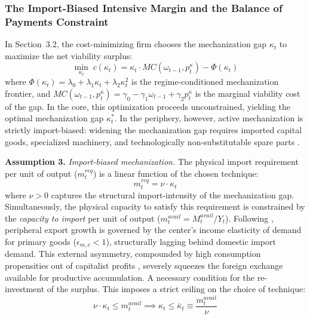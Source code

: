 \subsubsection{The Import-Biased Intensive Margin and the
	Balance of Payments Constraint}

In Section~3.2, the cost-minimizing firm chooses the
mechanization gap $\kappa_t$ to maximize the net viability
surplus:
\begin{equation}
	\min_{\kappa_t}\; c(\kappa_t)
	= \kappa_t \cdot MC(\omega_{t-1}, p^\kappa_t) - \Phi(\kappa_t)
	\label{eq:33:objective_periphery}
\end{equation}
where $\Phi(\kappa_t) = \lambda_0 + \lambda_1 \kappa_t
+ \lambda_2 \kappa_t^2$ is the regime-conditioned
mechanization frontier, and $MC(\omega_{t-1}, p^\kappa_t)
= \gamma_0 - \gamma_1 \omega_{t-1} + \gamma_2 p^\kappa_t$
is the marginal viability cost of the gap. In the core, this
optimization proceeds unconstrained, yielding the optimal
mechanization gap $\kappa_t^*$. In the periphery, however,
active mechanization is strictly import-biased: widening the
mechanization gap requires imported capital goods, specialized
machinery, and technologically non-substitutable spare parts \citep{Vernengo2006}.

\textbf{Assumption 3.} \textit{Import-biased mechanization.}
The physical import requirement per unit of output
($m^{req}_t$) is a linear function of the chosen technique:
\begin{equation}
	m^{req}_t = \nu \cdot \kappa_t
	\label{eq:33:import_req}
\end{equation}
where $\nu > 0$ captures the structural import-intensity of
the mechanization gap. Simultaneously, the physical capacity
to satisfy this requirement is constrained by the 
\textit{capacity to import} per unit of output
($m^{avail}_t = M^{avail}_t / Y_t$). Following
\citet{Prebisch1981}, peripheral export growth is governed by
the center's income elasticity of demand for primary goods
($\epsilon_{m,c} < 1$), structurally lagging behind domestic
import demand. This external asymmetry, compounded by high
consumption propensities out of capitalist profits
\citep{Kaldor1959}, severely squeezes the foreign exchange
available for productive accumulation. A necessary condition for the re-investment of the surplus. This imposes a strict
ceiling on the choice of technique: 
\begin{equation}
	\nu \cdot \kappa_t \le m^{avail}_t
	\implies \kappa_t \le \bar{\kappa}_t
	\equiv \frac{m^{avail}_t}{\nu}
	\label{eq:33:bop_ceiling}
\end{equation}

